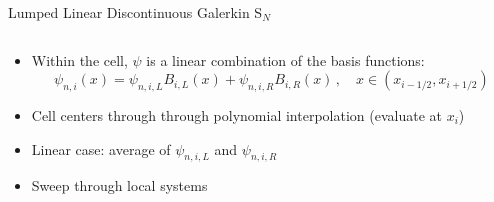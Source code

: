 \documentclass[10pt]{beamer}
\newcommand{\SN}{S$_N$\xspace}
\begin{document}
\begin{frame}{Lumped Linear Discontinuous Galerkin \SN}
\begin{columns}
\begin{column}{1.06\textwidth}
\begin{itemize}
		\item 
		Within the cell, $\psi$ is a linear combination of the basis functions:
		\begin{equation*}
			\psi_{n,i}(x) = \psi_{n,i,L} B_{i,L}(x) + \psi_{n,i,R} B_{i,R}(x) \,, \quad x \in (x_{i-1/2},x_{i+1/2})
		\end{equation*}
		\item 
		Cell centers through through polynomial interpolation (evaluate at $x_i$) 

		\item 
		Linear case: average of $\psi_{n,i,L}$ and $\psi_{n,i,R}$ 

		\item Sweep through local systems 

	\end{itemize}

	\end{column}
	\end{columns}

\end{frame}






% 		

\end{document}
